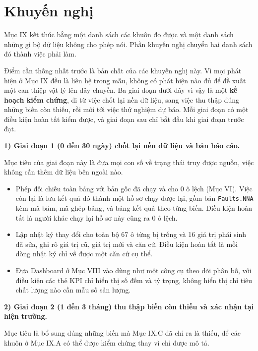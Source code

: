 \documentclass[12pt]{article}
\begin{document}
\clearpage
\section{Khuyến nghị}

Mục IX kết thúc bằng một danh sách các khuôn đo được và một danh sách những gì bộ dữ liệu không cho phép nói. Phần khuyến nghị chuyển hai danh sách đó thành việc phải làm.

\noindent
Điểm cần thống nhất trước là bản chất của các khuyến nghị này. Vì mọi phát hiện ở Mục IX đều là liên hệ trong mẫu, không có phát hiện nào đủ để đề xuất một can thiệp vật lý lên dây chuyền. Ba giai đoạn dưới đây vì vậy là một \textbf{kế hoạch kiểm chứng}, đi từ việc chốt lại nền dữ liệu, sang việc thu thập đúng những biến còn thiếu, rồi mới tới việc thử nghiệm dự báo. Mỗi giai đoạn có một điều kiện hoàn tất kiểm được, và giai đoạn sau chỉ bắt đầu khi giai đoạn trước đạt.\medskip

\noindent
\textbf{1) Giai đoạn 1 (0 đến 30 ngày) chốt lại nền dữ liệu và bản báo cáo.}

\noindent
Mục tiêu của giai đoạn này là đưa mọi con số về trạng thái truy được nguồn, việc không cần thêm dữ liệu bên ngoài nào.

\begin{itemize}
  \item Phép đối chiếu toàn bảng với bản gốc đã chạy và cho 0 ô lệch (Mục VI). Việc còn lại là lưu kết quả đó thành một hồ sơ chạy được lại, gồm bản \texttt{Faults.NNA} kèm mã băm, mã ghép bảng, và bảng kết quả theo từng biến. Điều kiện hoàn tất là người khác chạy lại hồ sơ này cũng ra 0 ô lệch.
  \item Lập nhật ký thay đổi cho toàn bộ 67 ô từng bị trống và 16 giá trị phái sinh đã sửa, ghi rõ giá trị cũ, giá trị mới và căn cứ. Điều kiện hoàn tất là mỗi dòng nhật ký chỉ về được một căn cứ cụ thể.
  \item Đưa Dashboard ở Mục VIII vào dùng như một công cụ theo dõi phân bố, với điều kiện các thẻ KPI chỉ hiển thị số đếm và tỷ trọng, không hiển thị chỉ tiêu chất lượng nào cần mẫu số sản lượng.
\end{itemize}

\noindent
\textbf{2) Giai đoạn 2 (1 đến 3 tháng) thu thập biến còn thiếu và xác nhận tại hiện trường.}

\noindent
Mục tiêu là bổ sung đúng những biến mà Mục IX.C đã chỉ ra là thiếu, để các khuôn ở Mục IX.A có thể được kiểm chứng thay vì chỉ được mô tả.
\end{document}
